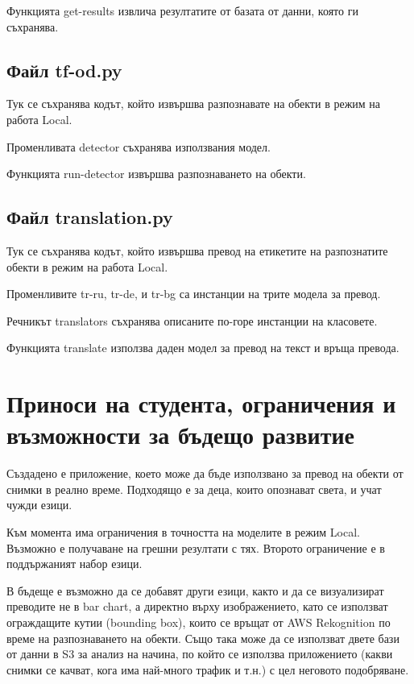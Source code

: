 \documentclass[12pt]{article}
\begin{document}
\noindent Функцията get-results извлича резултатите от базата от данни, която ги съхранява.

\subsection{Файл tf-od.py}
\noindent Тук се съхранява кодът, който извършва разпознавате на обекти в режим на работа Local.

\noindent Променливата detector съхранява използвания модел.

\noindent Функцията run-detector извършва разпознаването на обекти.

\subsection{Файл translation.py}

\noindent Тук се съхранява кодът, който извършва превод на етикетите на разпознатите обекти в режим на работа Local.

\noindent Променливите tr-ru, tr-de, и tr-bg са инстанции на трите модела за превод.

\noindent Речникът translators съхранява описаните по-горе инстанции на класовете.

\noindent Функцията translate използва даден модел за превод на текст и връща превода.

\section{Приноси на студента, ограничения и възможности за бъдещо развитие}

Създадено е приложение, което може да бъде използвано за превод на обекти от снимки в реално време. Подходящо е за деца, които опознават света, и учат чужди езици.

\medskip

\noindent Към момента има ограничения в точността на моделите в режим Local. Възможно е получаване на грешни резултати с тях. Второто ограничение е в поддържаният набор езици.

\medskip

\noindent В бъдеще е възможно да се добавят други езици, както и да се визуализират преводите не в bar chart, а директно върху изображението, като се използват ограждащите кутии (bounding box), които се връщат от AWS Rekognition по време на разпознаването на обекти. Също така може да се използват двете бази от данни в S3 за анализ на начина, по който се използва приложението (какви снимки се качват, кога има най-много трафик и т.н.) с цел неговото подобряване.
\end{document}
